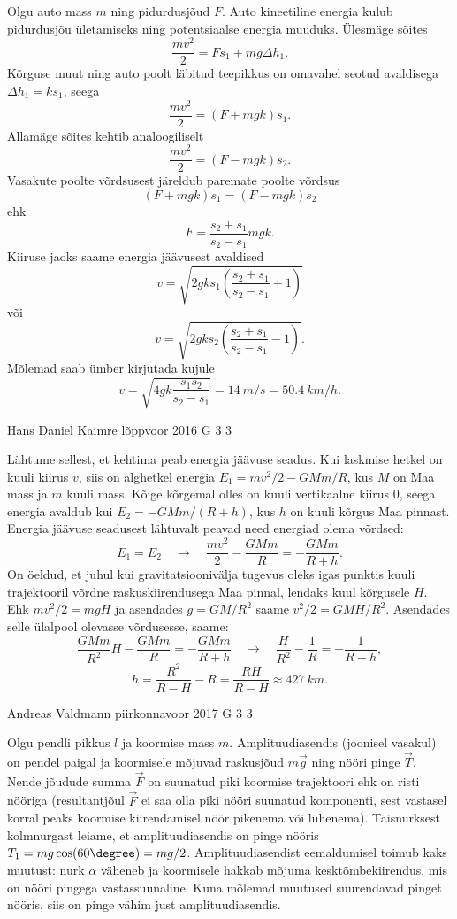 \documentclass[11pt]{article}
\begin{document}
{{\ifSolution
Olgu auto mass $m$ ning pidurdusjõud $F$. Auto kineetiline energia kulub pidurdusjõu ületamiseks ning potentsiaalse energia muuduks. Ülesmäge sõites
\[
\frac{mv^2}{2}=Fs_1+mg\Delta h_1.
\]
Kõrguse muut ning auto poolt läbitud teepikkus on omavahel seotud avaldisega $\Delta h_1=ks_1$, seega
\[
\frac{mv^2}{2}=\left(F+mgk\right)s_1.
\]
Allamäge sõites kehtib analoogiliselt
\[
\frac{mv^2}{2}=\left(F-mgk\right)s_2.
\]
Vasakute poolte võrdsusest järeldub paremate poolte võrdsus 
\[
\left(F+mgk\right)s_1=\left(F-mgk\right)s_2
\]
ehk
\[
F=\frac{s_2+s_1}{s_2-s_1}mgk.
\]
Kiiruse jaoks saame energia jäävusest avaldised 
\[
v=\sqrt{2gks_1\left(\frac{s_2+s_1}{s_2-s_1}+1\right)}
\]
või
\[
v=\sqrt{2gks_2\left(\frac{s_2+s_1}{s_2-s_1}-1\right)}.
\]
Mõlemad saab ümber kirjutada kujule 
\[
v=\sqrt{4gk\frac{s_1s_2}{s_2-s_1}}=\SI{14}{m \per s}=\SI{50.4}{km \per h}.
\]
\fi
}

{Hans Daniel Kaimre} %
{lõppvoor} %
{2016} %
{G 3} %
{3} %
{

\ifSolution
Lähtume sellest, et kehtima peab energia jäävuse seadus. Kui laskmise hetkel on kuuli kiirus $v$, siis on alghetkel energia $E_1 = mv^2/2 - GMm/R$, kus $M$ on Maa mass ja $m$ kuuli mass. Kõige kõrgemal olles on kuuli vertikaalne kiirus \num{0}, seega energia avaldub kui $E_2 = -GMm/(R+h)$, kus $h$ on kuuli kõrgus Maa pinnast. Energia jäävuse seadusest lähtuvalt peavad need energiad olema võrdsed:$$E_1 = E_2 \quad\rightarrow\quad \frac{mv^2}{2} - \frac{GMm}{R} = -\frac{GMm}{R+h}.$$
On öeldud, et juhul kui gravitatsioonivälja tugevus oleks igas punktis kuuli trajektooril võrdne raskuskiirendusega Maa pinnal, lendaks kuul kõrgusele $H$. Ehk $mv^2/2=mgH$ ja asendades $g=GM/R^2$ saame $v^2/2=GMH/R^2$. Asendades selle ülalpool olevasse võrdusesse, saame:
$$\frac{GMm}{R^2}H - \frac{GMm}{R} = -\frac{GMm}{R+h} \quad\rightarrow\quad \frac{H}{R^2}-\frac{1}{R} = - \frac{1}{R+h},$$
$$h=\frac{R^2}{R-H} - R = \frac{RH}{R-H} \approx \SI{427}{km}.$$
\fi
}

{Andreas Valdmann} %
{piirkonnavoor} %
{2017} %
{G 3} %
{3} %
{

\ifSolution
Olgu pendli pikkus $l$ ja koormise mass $m$. Amplituudiasendis (joonisel vasakul) on pendel paigal ja koormisele mõjuvad raskusjõud $m\vec{g}$ ning nööri pinge $\vec{T}$. Nende jõudude summa $\vec{F}$ on suunatud piki koormise trajektoori ehk on risti nööriga (resultantjõul $\vec{F}$ ei saa olla piki nööri suunatud komponenti, sest vastasel korral peaks koormise kiirendamisel nöör pikenema või lühenema). Täisnurksest kolmnurgast leiame, et amplituudiasendis on pinge nööris $T_1 = mg\cos(60\degree) = mg / 2$. Amplituudiasendist eemaldumisel toimub kaks muutust: nurk $\alpha$ väheneb ja koormisele hakkab mõjuma kesktõmbekiirendus, mis on nööri pingega vastassuunaline. Kuna mõlemad muutused suurendavad pinget nööris, siis on pinge vähim just amplituudiasendis.

}}
\end{document}
